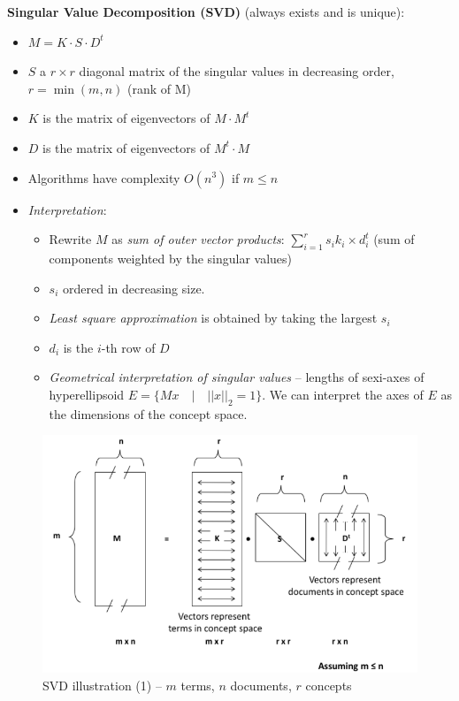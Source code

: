     \textbf{Singular Value Decomposition (SVD)} (always exists and is unique):
    \begin{itemize}
      \item $M = K\cdot S\cdot D^t$
      \item $S$ a $r\times r$ diagonal matrix of the singular values in decreasing order, $r=\min{(m,n)}$ (rank of M)
      \item $K$ is the matrix of eigenvectors of $M\cdot M^t$
      \item $D$ is the matrix of eigenvectors of $M^t\cdot M$
      \item Algorithms have complexity $O(n^3)$ if $m\leq n$
      \item \emph{Interpretation}:
      \begin{itemize}
        \item Rewrite $M$ as \emph{sum of outer vector products}: $\sum_{i=1}^{r}{s_i k_i \times d_i^t}$ (sum of components weighted by the singular values)
        \item $s_i$ ordered in decreasing size.
        \item \emph{Least square approximation} is obtained by taking the largest $s_i$
        \item $d_i$ is the $i$-th row of $D$
        \item \emph{Geometrical interpretation of singular values} -- lengths of sexi-axes of hyperellipsoid $E=\{Mx\quad |\quad  ||x||_2=1\}$. We can interpret the axes of $E$ as the dimensions of the concept space.
      \end{itemize}
    \end{itemize}

    \begin{figure}[htp]
      \centering
        \includegraphics[width=.7\textwidth]{images/SVD1.png}
        \caption{SVD illustration (1) -- $m$ terms, $n$ documents, $r$ concepts}
        \label{fig:svd1}
    \end{figure}


